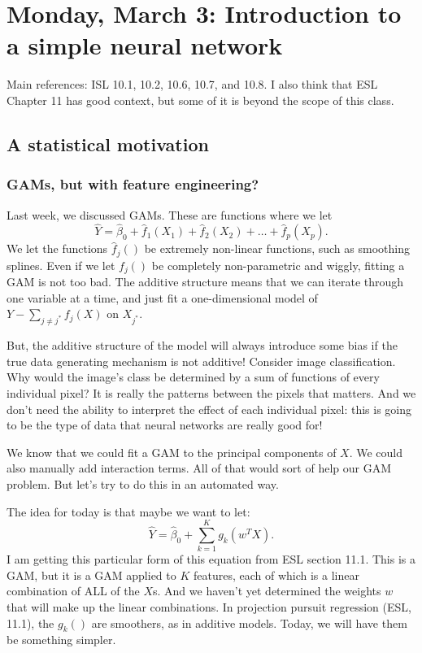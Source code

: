 \section{Monday, March 3: Introduction to a simple neural network}

Main references: ISL 10.1, 10.2, 10.6, 10.7, and 10.8. I also think that ESL Chapter 11 has good context, but some of it is beyond the scope of this class. 

\subsection{A statistical motivation}

\subsubsection{GAMs, but with feature engineering?}

Last week, we discussed GAMs. These are functions where we let
$$
\hat{Y} = \hat{\beta}_0 + \hat{f}_1 (X_1) + \hat{f}_2 (X_2) + \ldots + \hat{f}_p (X_p).
$$
We let the functions $\hat{f}_j()$ be extremely non-linear functions, such as smoothing splines. Even if we let $f_j()$ be completely non-parametric and wiggly, fitting a GAM is not too bad. The additive structure means that we can iterate through one variable at a time, and just fit a one-dimensional model of $Y - \sum_{j \neq  j^*} f_j(X)$ on $X_{j^*}$.

But, the additive structure of the model will always introduce some bias if the true data generating mechanism is not additive! Consider image classification. Why would the image's class be determined by a sum of functions of every individual pixel? It is really the patterns between the pixels that matters. And we don't need the ability to interpret the effect of each individual pixel: this is going to be the type of data that neural networks are really good for!

We know that we could fit a GAM to the principal components of $X$. We could also manually add interaction terms. All of that would sort of help our GAM problem. But let's try to do this in an automated way.

The idea for today is that maybe we want to let:
$$
\hat{Y} = \hat{\beta}_0 + \sum_{k=1}^K g_k(w^T X).
$$
I am getting this particular form of this equation from ESL section 11.1. This is a GAM, but it is a GAM applied to $K$ features, each of which is a linear combination of ALL of the $X$s. And we haven't yet determined the weights $w$ that will make up the linear combinations. In projection pursuit regression (ESL, 11.1), the $g_k()$ are smoothers, as in additive models. Today, we will have them be something simpler. 

